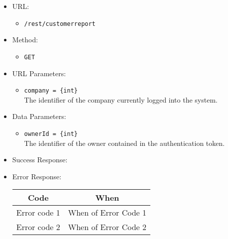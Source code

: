 \begin{itemize}
    
    \item URL: 
    \begin{itemize}
        \item \texttt{/rest/customerreport}
    \end{itemize}
    
    \item Method: 
    \begin{itemize}
        \item \texttt{GET}
    \end{itemize}
    
    \item URL Parameters: 
    \begin{itemize}
        \item \texttt{company = \{int\}} \\
        The identifier of the company currently logged into the system.
    \end{itemize}
    
    \item Data Parameters: 
    \begin{itemize}
        \item \texttt{ownerId = \{int\}} \\
        The identifier of the owner contained in the authentication token.
    \end{itemize}
    
    \item Success Response: 
    
    \item Error Response:
    \begin{table}[!h]
    \centering 
    \begin{tabular}{|c|c|}
    \hline
    \multicolumn{1}{|c|}{\textbf{Code}} & \multicolumn{1}{c|}{\textbf{When}} \\ \hline
    Error code 1 & When of Error Code 1 \\\hline
    Error code 2 & When of Error Code 2 \\\hline
    \end{tabular} 
    \end{table} 
    
\end{itemize}



